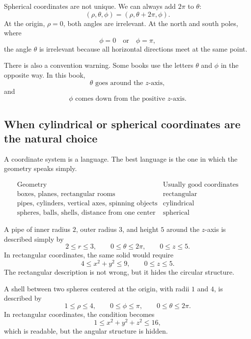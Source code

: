 Spherical coordinates are not unique.  We can always add \(2\pi\) to \(\theta\):
\[
    (\rho,\theta,\phi)
    =
    (\rho,\theta+2\pi,\phi).
\]
At the origin, \(\rho=0\), both angles are irrelevant.  At the north and south poles,
where
\[
    \phi=0
    \quad\text{or}\quad
    \phi=\pi,
\]
the angle \(\theta\) is irrelevant because all horizontal directions meet at the same
point.

There is also a convention warning.  Some books use the letters \(\theta\) and \(\phi\)
in the opposite way.  In this book,
\[
    \theta \text{ goes around the } z\text{-axis},
\]
and
\[
    \phi \text{ comes down from the positive } z\text{-axis}.
\]

\subsection{When cylindrical or spherical coordinates are the natural choice}

A coordinate system is a language.  The best language is the one in which the geometry
speaks simply.

\[
\begin{array}{c|c}
\text{Geometry} & \text{Usually good coordinates} \\ \hline
\text{boxes, planes, rectangular rooms} & \text{rectangular}\\
\text{pipes, cylinders, vertical axes, spinning objects} & \text{cylindrical}\\
\text{spheres, balls, shells, distance from one center} & \text{spherical}
\end{array}
\]

\begin{example}
A pipe of inner radius \(2\), outer radius \(3\), and height \(5\) around the \(z\)-axis is
described simply by
\[
    2\le r\le3,
    \qquad
    0\le\theta\le2\pi,
    \qquad
    0\le z\le5.
\]
In rectangular coordinates, the same solid would require
\[
    4\le x^2+y^2\le9,
    \qquad
    0\le z\le5.
\]
The rectangular description is not wrong, but it hides the circular structure.
\end{example}

\begin{example}
A shell between two spheres centered at the origin, with radii \(1\) and \(4\), is described
by
\[
    1\le \rho\le4,
    \qquad
    0\le\phi\le\pi,
    \qquad
    0\le\theta\le2\pi.
\]
In rectangular coordinates, the condition becomes
\[
    1\le x^2+y^2+z^2\le16,
\]
which is readable, but the angular structure is hidden.
\end{example}

